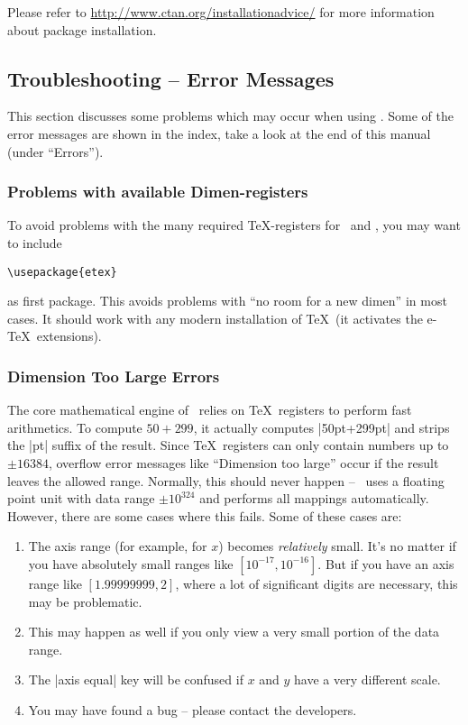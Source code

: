 Please refer to \url{http://www.ctan.org/installationadvice/} for more information about package installation.



\subsection{Troubleshooting -- Error Messages}
This section discusses some problems which may occur when using \PGFPlots.
Some of the error messages are shown in the index, take a look at the end of this manual (under ``Errors'').


\subsubsection{Problems with available Dimen-registers}
To avoid problems with the many required \TeX-registers for \PGF\ and \PGFPlots, you may want to include
\begin{verbatim}
\usepackage{etex}
\end{verbatim}
as first package. This avoids problems with ``no room for a new dimen''
%
in most cases. It should work with any modern installation of \TeX\ (it activates the e-\TeX\ extensions).

\subsubsection{Dimension Too Large Errors}
The core mathematical engine of \PGF\ relies on \TeX\ registers to perform fast arithmetics. To compute $50+299$, it actually computes |50pt+299pt| and strips the |pt| suffix of the result. Since \TeX\ registers can only contain numbers up to $\pm 16384$, overflow error messages like ``Dimension too large'' occur if the result leaves the allowed range. Normally, this should never happen -- \PGFPlots\ uses a floating point unit with data range $\pm 10^{324}$ and performs all mappings automatically. However, there are some cases where this fails. Some of these cases are:
\begin{enumerate}
	\item The axis range (for example, for $x$) becomes \emph{relatively} small. It's no matter if you have absolutely small ranges like $[10^{-17},10^{-16}]$. But if you have an axis range like $[1.99999999,2]$, where a lot of significant digits are necessary, this may be problematic.
	\item This may happen as well if you only view a very small portion of the data range.
	\item The |axis equal| key will be confused if $x$ and $y$ have a very different scale.
	\item You may have found a bug -- please contact the developers.
\end{enumerate}

